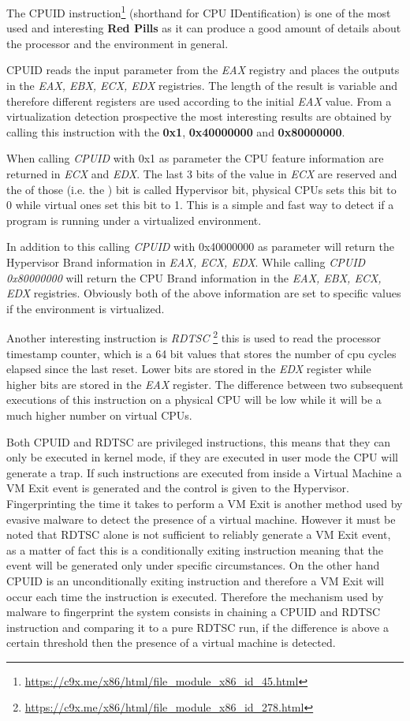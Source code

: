 The CPUID instruction\footnote{\url{https://c9x.me/x86/html/file_module_x86_id_45.html}} (shorthand for CPU IDentification) is one of the most used and interesting \textbf{Red Pills} as it can produce a good amount of details about the processor and the environment in general.

CPUID reads the input parameter from the \textit{EAX} registry and places the outputs in the \textit{EAX, EBX, ECX, EDX} registries. The length of the result is variable and therefore different registers are used according to the initial \textit{EAX} value. From a virtualization detection prospective the most interesting results are obtained by calling this instruction with the \textbf{0x1}, \textbf{0x40000000} and \textbf{0x80000000}\cite{CPUID}. 

When calling \textit{CPUID} with 0x1 as parameter the CPU feature information are returned in \textit{ECX} and \textit{EDX}. The last 3 bits of the value in \textit{ECX} are reserved and the  of those (i.e. the ) bit is called Hypervisor bit, physical CPUs sets this bit to 0 while virtual ones set this bit to 1. This is a simple and fast way to detect if a program is running under a virtualized environment. 

In addition to this calling \textit{CPUID} with 0x40000000 as parameter will return the Hypervisor Brand information in \textit{EAX, ECX, EDX}. While calling \textit{CPUID 0x80000000} will return the CPU Brand information in the \textit{EAX, EBX, ECX, EDX} registries. Obviously both of the above information are set to specific values if the environment is virtualized. 

Another interesting instruction is \textit{RDTSC} \footnote{\url{https://c9x.me/x86/html/file_module_x86_id_278.html}} this is used to read the processor timestamp counter, which is a 64 bit values that stores the number of cpu cycles elapsed since the last reset. Lower bits are stored in the \textit{EDX} register while higher bits are stored in the \textit{EAX} register. The difference between two subsequent executions of this instruction on a physical CPU will be low while it will be a much higher number on virtual CPUs.

Both CPUID and RDTSC are privileged instructions, this means that they can only be executed in kernel mode, if they are executed in user mode the CPU will generate a trap. If such instructions are executed from inside a Virtual Machine a VM Exit event is generated and the control is given to the Hypervisor. Fingerprinting the time it takes to perform a VM Exit is another method used by evasive malware to detect the presence of a virtual machine. However it must be noted that RDTSC alone is not sufficient to reliably generate a VM Exit event, as a matter of fact this is a conditionally exiting instruction meaning that the event will be generated only under specific circumstances. On the other hand CPUID is an unconditionally exiting instruction and therefore a VM Exit will occur each time the instruction is executed. Therefore the mechanism used by malware to fingerprint the system consists in chaining a CPUID and RDTSC instruction and comparing it to a pure RDTSC run, if the difference is above a certain threshold then the presence of a virtual machine is detected.

